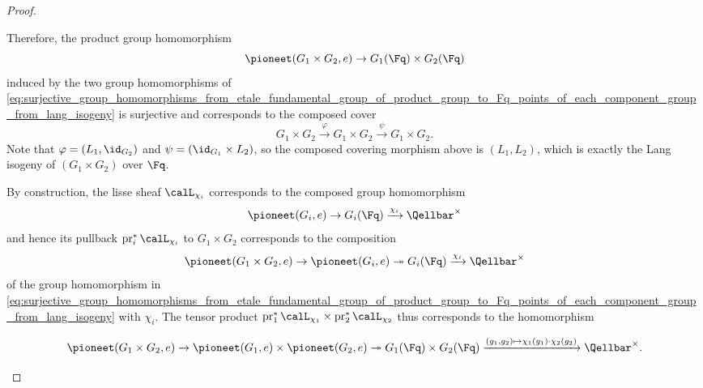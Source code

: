 \begin{proof}
\begin{enumerate}
        Therefore, the product group homomorphism 
        \begin{equation} \label{eq:group_homomorphism_from_etale_fundamental_group_of_product_of_group_schemes_to_product_of_Fq_rational_points_via_lang_isogenies}
        \pioneet(G_{1} \times G_2, e) \to G_1(\Fq) \times G_2(\Fq)
        \end{equation}
        induced by the two group homomorphisms of \eqref{eq:surjective_group_homomorphisms_from_etale_fundamental_group_of_product_group_to_Fq_points_of_each_component_group_from_lang_isogeny} is surjective and corresponds to the composed cover 
        $$G_1 \times G_2 \xrightarrow{\varphi} G_1 \times G_2 \xrightarrow{\psi} G_1 \times G_2.$$
        Note that $\varphi = (L_1, \id_{G_2})$ and $\psi = (\id_{G_1} \times L_2)$, so the composed covering morphism above is $(L_1, L_2)$, which is exactly the Lang isogeny of $(G_1 \times G_2)$ over $\Fq$.

        By construction, the lisse sheaf $\calL_{\chi_i}$ corresponds to the composed group homomorphism
        $$\pioneet(G_i, e) \to G_i(\Fq) \xrightarrow{\chi_i} \Qellbar^\times$$
        and hence its pullback $\operatorname{pr}_i^* \calL_{\chi_i}$ to $G_1 \times G_2$ corresponds to the composition
        $$\pioneet(G_{1} \times G_2, e) \to \pioneet(G_{i}, e) \twoheadrightarrow G_i(\Fq) \xrightarrow{\chi_i} \Qellbar^\times$$
        of the group homomorphism in \eqref{eq:surjective_group_homomorphisms_from_etale_fundamental_group_of_product_group_to_Fq_points_of_each_component_group_from_lang_isogeny} with $\chi_i$. The tensor product $\operatorname{pr}_1^* \calL_{\chi_1} \times \operatorname{pr}_2^* \calL_{\chi_2}$ thus corresponds to the homomorphism

        \begin{equation} \label{eq:homomorphism_from_fundamental_group_of_product_of_algebraic_groups_over_finite_field_via_product_of_characters}
        \pioneet(G_{1} \times G_2, e) \to \pioneet(G_{1}, e) \times \pioneet(G_{2}, e) \twoheadrightarrow G_1(\Fq) \times G_2(\Fq) \xrightarrow{(g_1,g_2) \mapsto \chi_1(g_1) \cdot \chi_2(g_2)} \Qellbar^\times.
        \end{equation}


\end{enumerate}
\end{proof}
